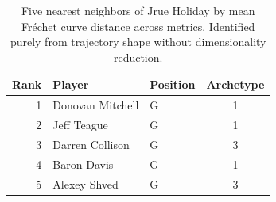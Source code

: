 \begin{table}[htbp]
  \centering\small
  \begin{tabular}{rllc}
    \toprule
    Rank & Player & Position & Archetype \\
    \midrule
    1 & Donovan Mitchell & G & 1 \\
    2 & Jeff Teague & G & 1 \\
    3 & Darren Collison & G & 3 \\
    4 & Baron Davis & G & 1 \\
    5 & Alexey Shved & G & 3 \\
    \bottomrule
  \end{tabular}
  \caption{Five nearest neighbors of Jrue Holiday by mean Fr\'{e}chet curve distance across metrics. Identified purely from trajectory shape without dimensionality reduction.}
  \label{tab:Jrue_Holiday_frechet_curve_neighbors}
\end{table}

